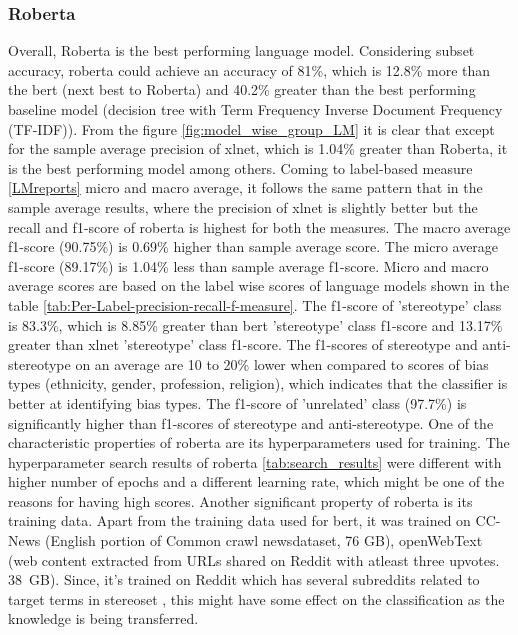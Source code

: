 \subsubsection{Roberta}
Overall, Roberta is the best performing language model. Considering subset accuracy, roberta could achieve an accuracy of 81\%, which is 12.8\% more than the bert (next best to Roberta) and 40.2\% greater than the best performing baseline model (decision tree with Term Frequency Inverse Document Frequency (TF-IDF)). From the figure \ref{fig:model_wise_group_LM} it is clear that except for the sample average precision of xlnet, which is 1.04\% greater than Roberta, it is the best performing model among others. Coming to label-based measure \ref{LMreports} micro and macro average, it follows the same pattern that in the sample average results, where the precision of xlnet is slightly better but the recall and f1-score of roberta is highest for both the measures. The macro average f1-score (90.75\%) is 0.69\% higher than sample average score. The micro average f1-score (89.17\%) is 1.04\% less than sample average f1-score. Micro and macro average scores are based on the label wise scores of language models shown in the table \ref{tab:Per-Label-precision-recall-f-measure}. The  f1-score of 'stereotype' class is 83.3\%, which is 8.85\% greater than bert 'stereotype' class f1-score and 13.17\% greater than xlnet 'stereotype' class f1-score. The f1-scores of stereotype and anti-stereotype on an average are 10 to 20\% lower when compared to scores of bias types (ethnicity, gender, profession, religion), which indicates that the classifier is better at identifying bias types. The f1-score of 'unrelated' class (97.7\%) is significantly higher than f1-scores of stereotype and anti-stereotype. One of the characteristic properties of roberta are its hyperparameters used for training. The hyperparameter search results of roberta \ref{tab:search_results} were different with higher number of epochs and a different learning rate, which might be one of the reasons for having high scores. Another significant property of roberta is its training data. Apart from the training data used for bert, it was trained on CC-News (English portion of Common crawl newsdataset, 76 GB), openWebText (web content extracted from URLs shared on Reddit with atleast three upvotes. 38 GB). Since, it's trained on Reddit which has several subreddits related to target terms in stereoset \cite{nadeem2020stereoset}, this might have some effect on the classification as the knowledge is being transferred. 

